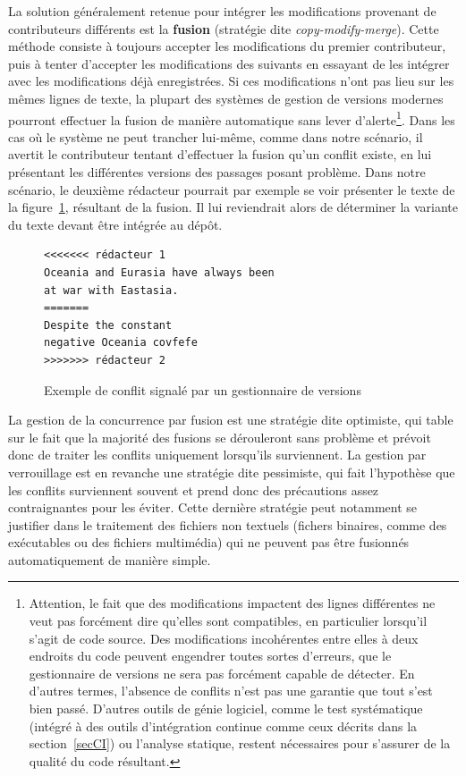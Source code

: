 La solution généralement retenue pour intégrer les modifications
provenant de contributeurs différents est la
\textbf{fusion} (stratégie dite
\textit{copy-modify-merge}). Cette méthode consiste à toujours
accepter les modifications du premier contributeur, puis à tenter
d'accepter les modifications des suivants en essayant de les intégrer
avec les modifications déjà enregistrées. Si ces modifications n'ont
pas lieu sur les mêmes lignes de texte, la plupart des systèmes de
gestion de versions modernes pourront effectuer la fusion de manière
automatique sans lever d'alerte\footnote{Attention, le fait que des
  modifications impactent des lignes différentes ne veut pas forcément
  dire qu'elles sont compatibles, en particulier lorsqu'il s'agit de
  code source. Des modifications incohérentes entre elles à deux
  endroits du code peuvent engendrer toutes sortes d'erreurs, que le
  gestionnaire de versions ne sera pas forcément capable de
  détecter. En d'autres termes, l'absence de conflits n'est pas une
  garantie que tout s'est bien passé. D'autres outils de génie
  logiciel, comme le test systématique (intégré à des outils
  d'intégration continue comme ceux décrits dans la
  section~\ref{secCI}) ou l'analyse statique, restent nécessaires pour
  s'assurer de la qualité du code résultant.}. Dans les cas où le
système ne peut trancher lui-même, comme dans notre scénario, il
avertit le contributeur tentant d'effectuer la fusion qu'un conflit
existe, en lui présentant les différentes versions des passages posant
problème. Dans notre scénario, le deuxième rédacteur pourrait par
exemple se voir présenter le texte de la figure~\ref{fig:conflitTxt},
résultant de la fusion. Il lui reviendrait alors de déterminer la
variante du texte devant être intégrée au dépôt.

\begin{figure}[h!]
\begin{minipage}{7cm}
\begin{lstlisting}
<<<<<<< rédacteur 1
Oceania and Eurasia have always been
at war with Eastasia.
=======
Despite the constant
negative Oceania covfefe
>>>>>>> rédacteur 2
\end{lstlisting}
\end{minipage}
\caption{Exemple de conflit signalé par un gestionnaire de
  versions\label{fig:conflitTxt}}
\end{figure}

La gestion de la concurrence par fusion est une stratégie dite \og
optimiste\fg, qui table sur le fait que la majorité des fusions se
dérouleront sans problème et prévoit donc de traiter les conflits
uniquement lorsqu'ils surviennent. La gestion par verrouillage est en
revanche une stratégie dite \og pessimiste\fg, qui fait l'hypothèse
que les conflits surviennent souvent et prend donc des précautions
assez contraignantes pour les éviter. Cette dernière stratégie peut
notamment se justifier dans le traitement des fichiers non textuels
(fichers binaires, comme des exécutables ou des fichiers multimédia)
qui ne peuvent pas être fusionnés automatiquement de manière simple.

